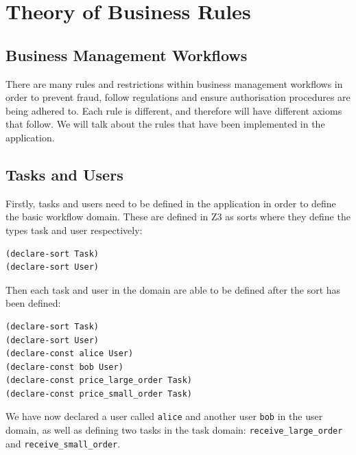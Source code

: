\documentclass[a4paper]{report}
\begin{document}
\chapter{Theory of Business Rules}
\section{Business Management Workflows}
There are many rules and restrictions within business management workflows in order to prevent fraud, follow regulations and ensure authorisation procedures are being adhered to. Each rule is different, and therefore will have different axioms that follow. We will talk about the rules that have been implemented in the application.\\

\section{Tasks and Users}
Firstly, tasks and users need to be defined in the application in order to define the basic workflow domain. These are defined in Z3 as sorts where they define the types task and user respectively:
\lstset{showspaces=false,
    showstringspaces=false, tabsize=2, breaklines=true,
    xleftmargin=5.0ex,
}
\lstset{basicstyle=\ttfamily}
\begin{lstlisting}[frame=single]
(declare-sort Task)
(declare-sort User)
\end{lstlisting}

Then each task and user in the domain are able to be defined after the sort has been defined: 
\lstset{showspaces=false,
    showstringspaces=false, tabsize=2, breaklines=true,
    xleftmargin=5.0ex,
}
\lstset{basicstyle=\ttfamily}
\begin{lstlisting}[frame=single]
(declare-sort Task)
(declare-sort User)
(declare-const alice User)
(declare-const bob User)
(declare-const price_large_order Task)
(declare-const price_small_order Task)
\end{lstlisting}
We have now declared a user called \texttt{alice} and another user \texttt{bob} in the user domain, as well as defining two tasks in the task domain:  \texttt{receive\_large\_order} and \texttt{receive\_small\_order}. \\

\newpage
\end{document}
